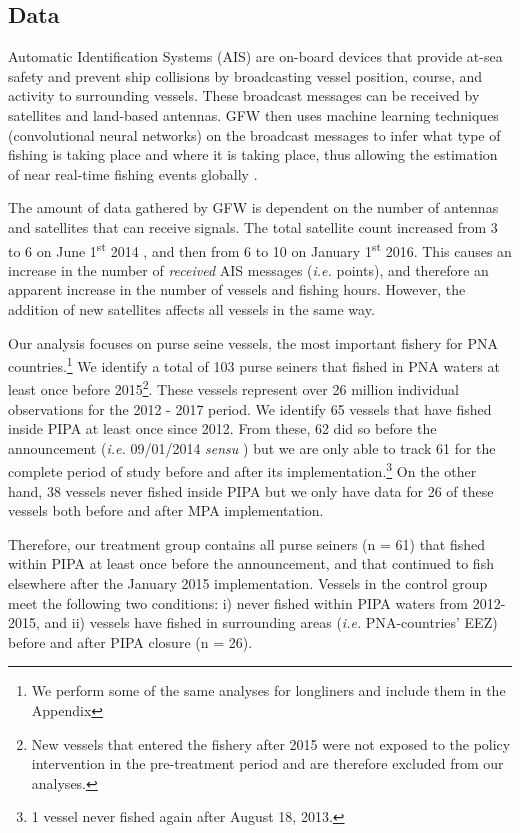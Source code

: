 \documentclass[11pt,english]{article}
\begin{document}
\subsection{Data}\label{data}

Automatic Identification Systems (AIS) are on-board devices that provide
at-sea safety and prevent ship collisions by broadcasting vessel
position, course, and activity to surrounding vessels. These broadcast
messages can be received by satellites and land-based antennas. GFW then uses 
machine learning techniques (convolutional neural networks) on the broadcast messages
to infer what type of fishing is taking place and where it is taking place, thus
allowing the estimation of near real-time fishing events globally \citep{kroodsma_2018}.

The amount of data gathered by GFW is dependent on the number of antennas and
satellites that can receive signals. The total satellite count increased from 3 to 6 on 
June 1\textsuperscript{st}
2014 , and then from 6 to 10 on January
1\textsuperscript{st} 2016. This causes an increase in the number of
\emph{received} AIS messages (\emph{i.e.} points), and therefore an
apparent increase in the number of vessels and fishing hours. However,
the addition of new satellites affects all vessels in the same way. 

Our analysis focuses on purse seine vessels, the most important fishery
for PNA
countries.\footnote{We perform some of the same analyses for longliners and include them in the Appendix}
We identify a total of 103 purse seiners that fished in PNA waters at
least once before
2015\footnote{New vessels that entered the fishery after 2015 were not exposed to the policy intervention in the pre-treatment period and are therefore excluded from our analyses.}.
These vessels represent over 26 million individual observations for the
2012 - 2017 period. We identify 65 vessels that have fished inside PIPA
at least once since 2012. From these, 62 did so before the announcement
(\emph{i.e.} 09/01/2014 \emph{sensu} \citep{mcdermott_2018}) but we are
only able to track 61 for the complete period of study before and after
its
implementation.\footnote{1 vessel never fished again after August 18, 2013.}
On the other hand, 38 vessels never fished inside PIPA but we only have
data for 26 of these vessels both before and after MPA implementation.

Therefore, our treatment group contains all purse seiners (n = 61) that
fished within PIPA at least once before the announcement, and that
continued to fish elsewhere after the January 2015 implementation.
Vessels in the control group meet the following two conditions: i)
never fished within PIPA waters from 2012-2015, and ii) vessels have fished in
surrounding areas (\emph{i.e.} PNA-countries' EEZ) before and after PIPA
closure (n = 26).
\end{document}
